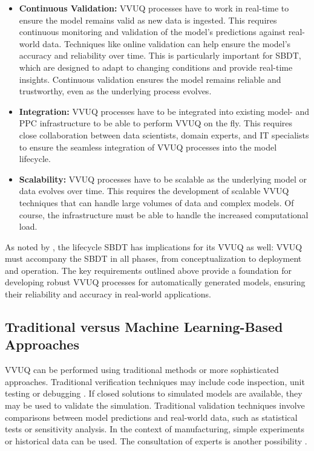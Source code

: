 \begin{itemize}
  \item \textbf{Continuous Validation:} VVUQ processes have to work in real-time to ensure the model remains valid as new data is ingested. This requires continuous monitoring and validation of the model's predictions against real-world data. Techniques like online validation \autocite{francis2021towards} can help ensure the model's accuracy and reliability over time. This is particularly important for SBDT, which are designed to adapt to changing conditions and provide real-time insights. Continuous validation ensures the model remains reliable and trustworthy, even as the underlying process evolves.
  \item \textbf{Integration:} VVUQ processes have to be integrated into existing model- and PPC infrastructure to be able to perform VVUQ on the fly. This requires close collaboration between data scientists, domain experts, and IT specialists to ensure the seamless integration of VVUQ processes into the model lifecycle.
  \item \textbf{Scalability:} VVUQ processes have to be scalable as the underlying model or data evolves over time. This requires the development of scalable VVUQ techniques that can handle large volumes of data and complex models. Of course, the infrastructure must be able to handle the increased computational load.
\end{itemize}

As noted by \citeauthor{francis2021towards}, the lifecycle SBDT has implications for its VVUQ as well: VVUQ must accompany the SBDT in all phases, from conceptualization to deployment and operation. The key requirements outlined above provide a foundation for developing robust VVUQ processes for automatically generated models, ensuring their reliability and accuracy in real-world applications.

\subsection{Traditional versus Machine Learning-Based Approaches}
\label{sec:ml-approaches}

VVUQ can be performed using traditional methods or more sophisticated approaches. Traditional verification techniques may include code inspection, unit testing or debugging \autocite{maniaci2018verification}. If closed solutions to simulated models are available, they may be used to validate the simulation. Traditional validation techniques involve comparisons between model predictions and real-world data, such as statistical tests or sensitivity analysis. In the context of manufacturing, simple experiments or historical data can be used. The consultation of experts is another possibility \autocite{shao2023credibility}.

